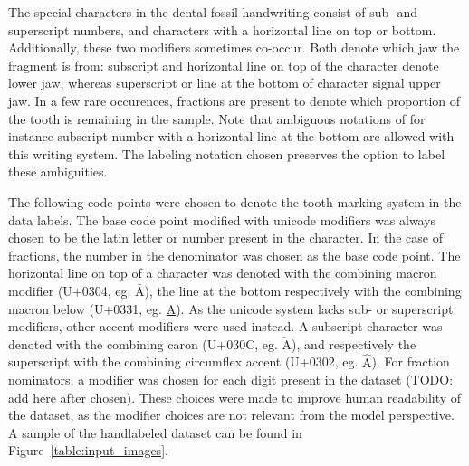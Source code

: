 \documentclass{article}
\begin{document}
The special characters in the dental fossil handwriting consist of sub- and superscript numbers, and characters with a horizontal line on 
top or bottom. Additionally, these two modifiers sometimes co-occur. Both denote which jaw the fragment is from: 
subscript and horizontal line on top of the character denote lower jaw, whereas superscript or line at the bottom of character 
signal upper jaw. In a few rare occurences, fractions are present 
to denote which proportion of the tooth is remaining in the sample. 
Note that ambiguous notations of for instance subscript number with a horizontal line at the bottom are allowed with this writing system.
The labeling notation chosen preserves the option to label these ambiguities.


The following code points were chosen to denote the tooth marking system in the data labels.
The base code point modified with unicode modifiers was always chosen to be the latin letter or number present in the character. In the case of 
fractions, the number in the denominator was chosen as the base code point. The horizontal line on top of a character was denoted with the
combining macron modifier (U+0304, eg. $\bar{\text{A}}$), the line at the bottom respectively with the combining macron below (U+0331, eg. \underline{A}).
As the unicode system lacks sub- or superscript modifiers, other accent modifiers were used instead. A subscript character was denoted with the combining caron (U+030C, eg. $\check{\mathrm{A}}$), and respectively the superscript with the combining
circumflex accent (U+0302, eg. $\hat{\text{A}}$). For fraction nominators, a modifier was chosen for each digit present in the dataset (TODO: add here after chosen).
These choices were made to improve human readability of the dataset, as the modifier choices are not relevant from the model perspective. A sample of the handlabeled 
dataset can be found in Figure~\ref{table:input_images}.
\end{document}

